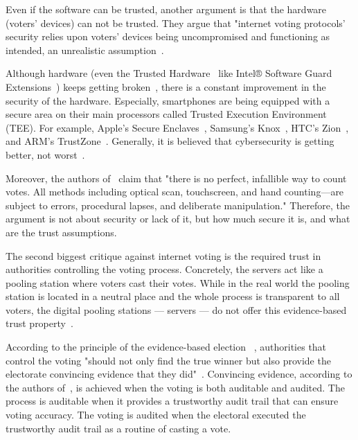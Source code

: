 \documentclass[runningheads]{llncs}
\begin{document}
Even if the software can be trusted, another argument is that the hardware (voters' devices) can not be trusted. They argue that "internet voting protocols' security relies upon voters' devices being uncompromised and functioning as intended, an unrealistic assumption~\cite{parkGoingBadWorse2021}.

Although hardware (even the Trusted Hardware~\cite{sionTrustedHardware2009} like Intel® Software Guard Extensions~\cite{mckeenIntelSoftwareGuard2016}) keeps getting broken~\cite{goodinIntelSGXVulnerable2020, IntelSGXBroken2019, bulckForeshadowExtractingKeys}, there is a constant improvement in the security of the hardware. Especially, smartphones are being equipped with a secure area on their main processors called Trusted Execution Environment (TEE). For example, Apple's Secure Enclaves~\cite{SecureEnclave}, Samsung's Knox~\cite{kanonovSecureContainersAndroid2016}, HTC's Zion~\cite{exodusZION}, and ARM's TrustZone~\cite{ARMSecurityTechnology}. Generally, it is believed that cybersecurity is getting better, not worst~\cite{golombBelieveItCybersecurity2018}.

Moreover, the authors of~\cite{appelEvidenceBasedElectionsCreate2019} claim that "there is no perfect, infallible way to count votes. All methods including optical scan, touchscreen, and hand counting—are subject to errors, procedural lapses, and deliberate manipulation." Therefore, the argument is not about security or lack of it, but how much secure it is, and what are the trust assumptions.

The second biggest critique against internet voting is the required trust in authorities controlling the voting process. Concretely, the servers act like a pooling station where voters cast their votes. While in the real world the pooling station is located in a neutral place and the whole process is transparent to all voters, the digital pooling stations — servers — do not offer this evidence-based trust property~\cite{starkEvidenceBasedElections2012}.

According to the principle of the evidence-based election ~\cite{starkEvidenceBasedElections2012}, authorities that control the voting "should not only find the true winner but also provide the electorate convincing evidence that they did"~\cite{appelEvidenceBasedElectionsCreate2019}. Convincing evidence, according to the authors of~\cite{starkEvidenceBasedElections2012}, is achieved when the voting is both auditable and audited. The process is auditable when it provides a trustworthy audit trail that can ensure voting accuracy. The voting is audited when the electoral executed the trustworthy audit trail as a routine of casting a vote.
\end{document}
